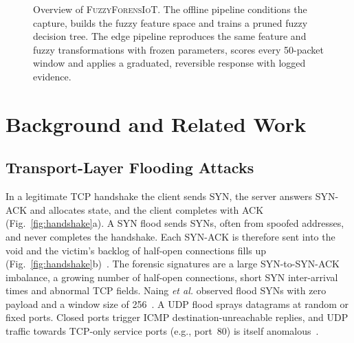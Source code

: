 \documentclass[conference]{IEEEtran}
\newcommand{\fname}{\textsc{FuzzyForensIoT}}
\begin{document}
\begin{figure}[t]
{}
\caption{Overview of \fname{}. The offline pipeline conditions the capture, builds the fuzzy feature space and trains a pruned fuzzy decision tree. The edge pipeline reproduces the same feature and fuzzy transformations with frozen parameters, scores every 50-packet window and applies a graduated, reversible response with logged evidence.}
\label{fig:arch}
\end{figure}

\section{Background and Related Work}
\label{sec:related}

\subsection{Transport-Layer Flooding Attacks}
In a legitimate TCP handshake the client sends SYN, the server answers SYN-ACK and allocates state, and the client completes with ACK (Fig.~\ref{fig:handshake}a). A SYN flood sends SYNs, often from spoofed addresses, and never completes the handshake. Each SYN-ACK is therefore sent into the void and the victim's backlog of half-open connections fills up (Fig.~\ref{fig:handshake}b)~\cite{eddy2007,cert1996}. The forensic signatures are a large SYN-to-SYN-ACK imbalance, a growing number of half-open connections, short SYN inter-arrival times and abnormal TCP fields. Naing \emph{et al.} observed flood SYNs with zero payload and a window size of 256~\cite{naing2023}. A UDP flood sprays datagrams at random or fixed ports. Closed ports trigger ICMP destination-unreachable replies, and UDP traffic towards TCP-only service ports (e.g., port~80) is itself anomalous~\cite{khaing2020}.
\end{document}
